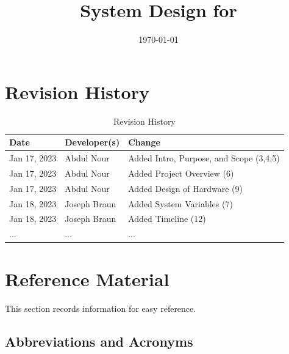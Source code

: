\documentclass[12pt, titlepage]{article}
\begin{document}
\title{System Design for \progname{}} 
\author{\authname}
\date{\today}

\maketitle


\section{Revision History}

\begin{table}[hp]
\caption{Revision History} \label{TblRevisionHistory}
\begin{tabularx}{\textwidth}{llX}
\toprule
\textbf{Date} & \textbf{Developer(s)} & \textbf{Change}\\
\midrule
Jan 17, 2023 & Abdul Nour & Added Intro, Purpose, and Scope (3,4,5)\\
Jan 17, 2023 & Abdul Nour & Added Project Overview (6)\\
Jan 17, 2023 & Abdul Nour & Added Design of Hardware (9)\\
Jan 18, 2023 & Joseph Braun & Added System Variables (7)\\
Jan 18, 2023 & Joseph Braun & Added Timeline (12)\\

... & ... & ...\\
\bottomrule
\end{tabularx}
\end{table}

\newpage

\section{Reference Material}

This section records information for easy reference.

\subsection{Abbreviations and Acronyms}
\end{document}
